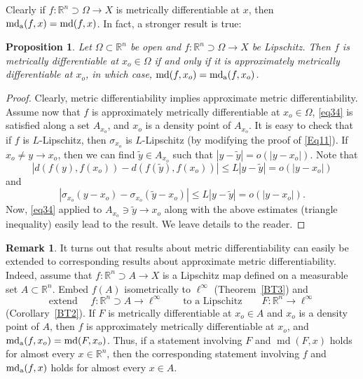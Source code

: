 \documentclass[12pt,leqno]{amsart}
\newtheorem{proposition}[theorem]{Proposition}
\theoremstyle{definition}
\newtheorem{remark}[theorem]{Remark}
\newcommand{\bbbr}{\mathbb R}
\def\md{\operatorname{md}}
\def\apmd{\operatorname{md_{\rm a}}}
\numberwithin{theorem}{section} \numberwithin{equation}{section}
\begin{document}
Clearly if $f:\bbbr^n\supset\Omega\to X$ is metrically differentiable at $x$, then $\apmd(f,x)=\md(f,x)$. In fact, a stronger result is true:
\begin{proposition}
\label{ADT2}
Let $\Omega \subset \bbbr^n$ be open and $f:\bbbr^n\supset\Omega\to X$ be Lipschitz. Then $f$ is metrically differentiable at $x_o\in \Omega$ if and only if it is approximately metrically differentiable at $x_o$, in which case, $\md(f,x_o)=\apmd(f,x_o)$.
\end{proposition}
\begin{proof}
Clearly, metric differentiability implies approximate metric differentiability. Assume now that $f$ is approximately metrically differentiable at $x_o\in\Omega$, \eqref{eq34} is satisfied along a set $A_{x_o}$, and $x_o$ is a density point of $A_{x_o}$. It is easy to check that if $f$ is $L$-Lipschitz, then $\sigma_{x_o}$ is $L$-Lipschitz (by modifying the proof of \eqref{Eq11}).
If $x_o\neq y\to x_o$, then we can find $\tilde{y}\in A_{x_o}$ such that $|y-\tilde{y}|=o(|y-x_o|)$.
Note that
$$
|d(f(y),f(x_o))-d(f(\tilde{y}),f(x_o))|\leq L|y-\tilde{y}|=o(|y-x_o|)
$$
and
$$
|\sigma_{x_o}(y-x_o)-\sigma_{x_o}(\tilde{y}-x_o)|\leq L|y-\tilde{y}|=o(|y-x_o|).
$$
Now, \eqref{eq34} applied to $A_{x_o}\ni\tilde{y}\to x_o$ along with the above estimates (triangle inequality)
easily lead to the result. We leave details to the reader.
\end{proof}
\begin{remark}
\label{R2}
It turns out that results about metric differentiability can easily be extended to corresponding results about approximate metric differentiability. Indeed, assume that $f:\bbbr^n\supset A\to X$ is a Lipschitz map defined on a measurable set $A\subset\bbbr^n$. Embed $f(A)$ isometrically to $\ell^\infty$ (Theorem~\ref{BT3}) and
$$
\text{extend }\quad f:\bbbr^n\supset A\to\ell^\infty
\qquad
\text{to a Lipschitz}
\qquad
F:\bbbr^n\to\ell^\infty
$$
(Corollary~\ref{BT2}). If $F$ is metrically differentiable at $x_o\in A$ and $x_o$ is a density point of $A$, then $f$ is approximately metrically differentiable at $x_o$, and $\apmd(f,x_o)=\md(F,x_o)$. Thus, if a statement involving $F$ and $\md(F,x)$ holds for almost every $x\in\bbbr^n$, then the corresponding statement involving $f$ and $\apmd(f,x)$ holds for almost every $x\in A$.
\end{remark}
\end{document}
